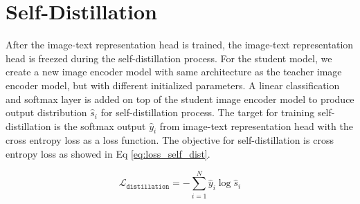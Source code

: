 \section{Self-Distillation}
After the image-text representation head is trained, the image-text representation head is freezed during the self-distillation process.
For the student model, we create a new image encoder model with same architecture as the teacher image encoder model, but with different initialized parameters.
A linear classification and softmax layer is added on top of the student image encoder model to produce output distribution $\hat{s}_i$ for self-distillation process.
The target for training self-distillation is the softmax output $\hat{y}_i$ from image-text representation head with the cross entropy loss as a loss function.
The objective for self-distillation is cross entropy loss as showed in Eq \ref{eq:loss_self_dist}.

\begin{equation}
    \label{eq:loss_self_dist}
    \mathcal{L}_{\texttt{distillation}} = -\sum_{i=1}^{N} \hat{y}_i\log\hat{s}_i
\end{equation}



